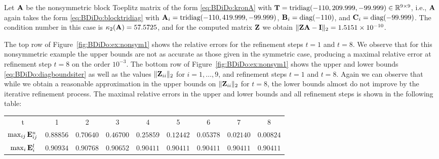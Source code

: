 \newpage
\begin{example}\label{ex:BDiDo:nonsym1}{\textrm
Let $\mathbf{A}$ be the nonsymmetric block Toeplitz matrix of the form
\eqref{eq:BDiDo:kronA} with
$\mathbf{T}=\textnormal{tridiag}(-110,209.999,-99.999)\in\mathbb{R}^{9\times 9}$, i.e.,
$\mathbf{A}$ again takes the form \eqref{eq:BDiDo:blocktridiag} with
$\mathbf{A}_i=\textnormal{tridiag}(-110,419.999,-99.999)$,
$\mathbf{B}_i=\textnormal{diag}(-110)$, and $\mathbf{C}_i=\textnormal{diag}(-99.999)$. The
condition number in this case is $\kappa_2(\mathbf{A})=57.5725$,  and for the computed
matrix $\mathbf{Z}$ we obtain $\|\mathbf{Z}\mathbf{A}-\mathbf{I}\|_2=1.5151\times 10^{-10}$.

The top row of \textnormal{Figure~\ref{fig:BDiDo:ex:nonsym1}} shows the
relative errors for the refinement steps $t=1$ and $t=8$. We observe that for
this nonsymmetric example the upper bounds are not as accurate as those given
in the symmetric case, producing a maximal relative error at refinement step
$t=8$ on the order $10^{-3}$. The bottom row of
\textnormal{Figure~\ref{fig:BDiDo:ex:nonsym1}} shows the upper and lower bounds
\eqref{eq:BDiDo:diagboundsiter} as well as the values $\|\mathbf{Z}_{ii}\|_2$ for
$i=1,\dots,9$, and refinement steps $t=1$ and $t=8$. Again we can observe that
while we obtain a reasonable approximation in the upper bounds on
$\|\mathbf{Z}_{ii}\|_2$ for $t=8$, the lower bounds almost do not improve by
the iterative refinement process. The maximal relative errors in the upper and
lower bounds and all refinement steps is shown in the following table:
%
%
\begin{table}[h!]\scriptsize\centering
\begin{tabular}{c c c c c c c c c}
\hline
  t & 1 & 2 & 3 & 4 & 5 & 6 & 7 & 8 \\
$\max_{ij}\mathbf{E}^{u}_{ij}$ &  $0.88856$ & $ 0.70640$ & $0.46700$ &  $0.25859$ & $0.12442$ & $0.05378$ &  $0.02140$ &  $0.00824$\\
$\max_i \mathbf{E}^{l}_{i}$ & $0.90934$ & $0.90768$ & $0.90652$ & $0.90411$ & $0.90411$ & $0.90411$ &  $0.90411$ &  $0.90411$\\
\hline
\end{tabular}
\end{table}
}
\end{example}

